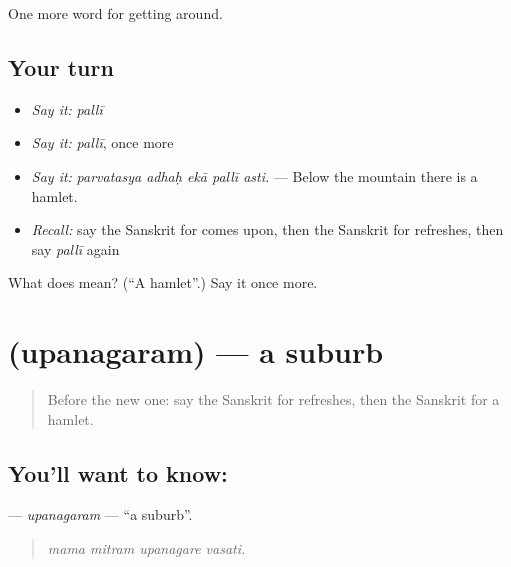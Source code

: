 \begin{grammarlens}[title={What you've built}]
One more word for getting around.
\end{grammarlens}

\subsection*{Your turn}
\begin{itemize}
\raggedright
  \item \emph{Say it:} \emph{pallī}
  \item \emph{Say it:} \emph{pallī}, once more
  \item \emph{Say it:} \emph{parvatasya adhaḥ ekā pallī asti.} — Below the mountain there is a hamlet.
  \item \emph{Recall:} say the Sanskrit for comes upon, then the Sanskrit for refreshes, then say \emph{pallī} again
\end{itemize}

\begin{tcolorbox}[breakable,colback=teal!4,colframe=teal!35!black,title={Before you move on}]
What does  mean? (\textquotedblleft{}A hamlet\textquotedblright{}.) Say it once more.
\end{tcolorbox}
\section[\texorpdfstring{\sk{उपनगरम्} (upanagaram)}{उपनगरम् (upanagaram)}]{ (upanagaram) — a suburb}

\label{lesson:SA-C421-upanagaram}



\begin{quote}
Before the new one: say the Sanskrit for refreshes, then the Sanskrit for a hamlet.
\end{quote}

\subsection*{You'll want to know: }
\textbf{} — \emph{upanagaram} — \textquotedblleft{}a suburb\textquotedblright{}.

\begin{quote}
   
\end{quote}

\begin{quote}
\emph{mama mitram upanagare vasati.}
\end{quote}

